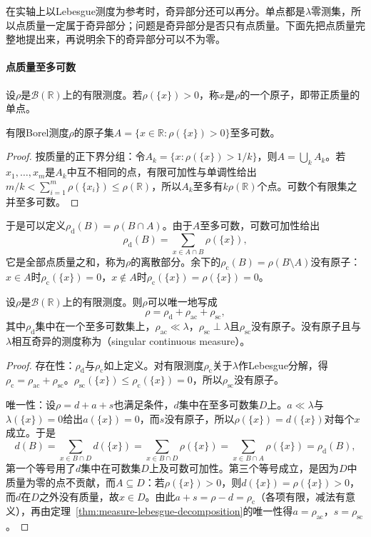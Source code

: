 在实轴上以Lebesgue测度为参考时，奇异部分还可以再分。单点都是$\lambda$零测集，所以点质量一定属于奇异部分；问题是奇异部分是否只有点质量。下面先把点质量完整地提出来，再说明余下的奇异部分可以不为零。

\paragraph{点质量至多可数}
设$\rho$是$\mathcal B(\mathbb R)$上的有限测度。若$\rho(\{x\})>0$，称$x$是$\rho$的一个原子，即带正质量的单点。

\begin{lemma}[正质量单点至多可数]
\label{lem:measure-atoms-countable}
有限Borel测度$\rho$的原子集$A=\{x\in\mathbb R:\rho(\{x\})>0\}$至多可数。
\end{lemma}

\begin{proof}
按质量的正下界分组：令$A_k=\{x:\rho(\{x\})>1/k\}$，则$A=\bigcup_kA_k$。若$x_1,\dots,x_m$是$A_k$中互不相同的点，有限可加性与单调性给出$m/k<\sum_{i=1}^m\rho(\{x_i\})\le\rho(\mathbb R)$，所以$A_k$至多有$k\rho(\mathbb R)$个点。可数个有限集之并至多可数。
\end{proof}

于是可以定义$\rho_{\mathrm d}(B)=\rho(B\cap A)$。由于$A$至多可数，可数可加性给出
\[
 \rho_{\mathrm d}(B)=\sum_{x\in A\cap B}\rho(\{x\}),
\]
它是全部点质量之和，称为$\rho$的离散部分。余下的$\rho_{\mathrm c}(B)=\rho(B\setminus A)$没有原子：$x\in A$时$\rho_{\mathrm c}(\{x\})=0$，$x\notin A$时$\rho_{\mathrm c}(\{x\})=\rho(\{x\})=0$。

\begin{theorem}[实轴上有限测度的三元分解]
\label{thm:measure-three-part}
设$\rho$是$\mathcal B(\mathbb R)$上的有限测度。则$\rho$可以唯一地写成
\[
 \rho=\rho_{\mathrm d}+\rho_{\mathrm{ac}}+\rho_{\mathrm{sc}},
\]
其中$\rho_{\mathrm d}$集中在一个至多可数集上，$\rho_{\mathrm{ac}}\ll\lambda$，$\rho_{\mathrm{sc}}\perp\lambda$且$\rho_{\mathrm{sc}}$没有原子。没有原子且与$\lambda$相互奇异的测度称为（singular continuous measure）。
\end{theorem}

\begin{proof}
存在性：$\rho_{\mathrm d}$与$\rho_{\mathrm c}$如上定义。对有限测度$\rho_{\mathrm c}$关于$\lambda$作Lebesgue分解，得$\rho_{\mathrm c}=\rho_{\mathrm{ac}}+\rho_{\mathrm{sc}}$。$\rho_{\mathrm{sc}}(\{x\})\le\rho_{\mathrm c}(\{x\})=0$，所以$\rho_{\mathrm{sc}}$没有原子。

唯一性：设$\rho=d+a+s$也满足条件，$d$集中在至多可数集$D$上。$a\ll\lambda$与$\lambda(\{x\})=0$给出$a(\{x\})=0$，而$s$没有原子，所以$\rho(\{x\})=d(\{x\})$对每个$x$成立。于是
\[
 d(B)=\sum_{x\in B\cap D}d(\{x\})=\sum_{x\in B\cap D}\rho(\{x\})=\sum_{x\in B\cap A}\rho(\{x\})=\rho_{\mathrm d}(B),
\]
第一个等号用了$d$集中在可数集$D$上及可数可加性。第三个等号成立，是因为$D$中质量为零的点不贡献，而$A\subseteq D$：若$\rho(\{x\})>0$，则$d(\{x\})=\rho(\{x\})>0$，而$d$在$D$之外没有质量，故$x\in D$。由此$a+s=\rho-d=\rho_{\mathrm c}$（各项有限，减法有意义），再由定理~\ref{thm:measure-lebesgue-decomposition}的唯一性得$a=\rho_{\mathrm{ac}}$，$s=\rho_{\mathrm{sc}}$。
\end{proof}

